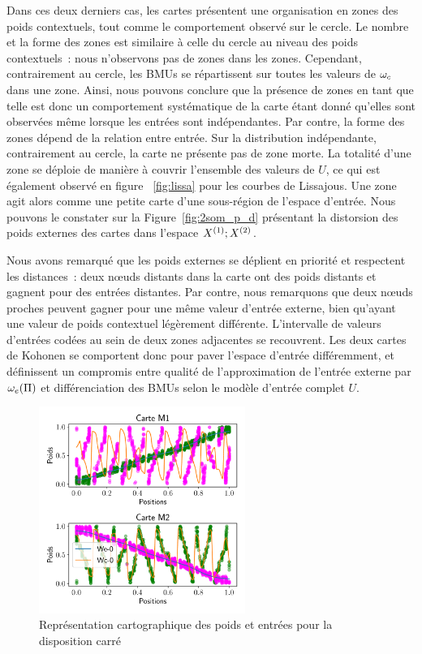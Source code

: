 \documentclass[../main]{subfiles}
\begin{document}
Dans ces deux derniers cas, les cartes présentent une organisation en zones des poids contextuels, tout comme le comportement observé sur le cercle. Le nombre et la forme des zones est similaire à celle du cercle au niveau des poids contextuels~: nous n'observons pas de zones dans les zones. Cependant, contrairement au cercle, les BMUs se répartissent sur toutes les valeurs de $\omega_c$ dans une zone.
Ainsi, nous pouvons conclure que la présence de zones en tant que telle est donc un comportement systématique de la carte étant donné qu'elles sont observées même lorsque les entrées sont indépendantes. Par contre, la forme des zones dépend de la relation entre entrée.
Sur la distribution indépendante, contrairement au cercle, la carte ne présente pas de zone morte. La totalité d'une zone se déploie de manière à couvrir l'ensemble des valeurs de $U$, ce qui est également observé en figure ~\ref{fig:lissa} pour les courbes de Lissajous.
Une zone agit alors comme une petite carte d'une sous-région de l'espace d'entrée. Nous pouvons le constater sur la Figure~\ref{fig:2som_p_d} présentant la distorsion des poids externes des cartes dans l'espace $X^{({1})}; X^{({2})}$.


Nous avons remarqué que les poids externes se déplient en priorité et respectent les distances~: deux n\oe{}uds distants dans la carte ont des poids distants et gagnent pour des entrées distantes.  
Par contre, nous remarquons que deux n\oe{}uds proches peuvent gagner pour une même valeur d'entrée externe, bien qu'ayant une valeur de poids contextuel légèrement différente.
L'intervalle de valeurs d'entrées codées au sein de deux zones adjacentes se recouvrent.
Les deux cartes de Kohonen se comportent donc pour paver l'espace d'entrée différemment, et définissent un compromis entre qualité de l'approximation de l'entrée externe par $\omega_e(\Pi)$ et différenciation des BMUs selon le modèle d'entrée complet $U$.


\begin{figure}
	\centering\includegraphics[width=0.6\textwidth]{2som_square_w.pdf}
	\caption{Représentation cartographique des poids et entrées pour la disposition carré}
\end{figure}
\end{document}
